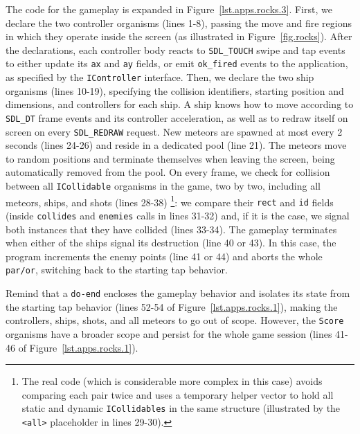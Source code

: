 \documentclass[preprint]{sigplanconf}
\newcommand{\code}[1] {{\small{\texttt{#1}}}}
\newcommand{\1}{\;}
\newcommand{\2}{\;\;}
\newcommand{\3}{\;\;\;}
\newcommand{\5}{\;\;\;\;\;}
\begin{document}
The code for the gameplay is expanded in Figure~\ref{lst.apps.rocks.3}.
%
First, we declare the two controller organisms (lines 1-8), passing the move 
and fire regions in which they operate inside the screen (as illustrated in 
Figure~\ref{fig.rocks}).
After the declarations, each controller body reacts to \code{SDL\_TOUCH} swipe 
and tap events to either update its \code{ax} and \code{ay} fields, or emit 
\code{ok\_fired} events to the application, as specified by the 
\code{IController} interface.
%
Then, we declare the two ship organisms (lines 10-19), specifying the collision 
identifiers, starting position and dimensions, and controllers for each ship.
A ship knows how to move according to \code{SDL\_DT} frame events and its 
controller acceleration, as well as to redraw itself on screen on every 
\code{SDL\_REDRAW} request.
%
New meteors are spawned at most every 2 seconds (lines 24-26) and reside in a 
dedicated pool (line 21).
The meteors move to random positions and terminate themselves when leaving the 
screen, being automatically removed from the pool.
%
On every frame, we check for collision between all \code{ICollidable} organisms 
in the game, two by two, including all meteors, ships, and shots (lines 
28-38)%
\footnote{
The real code (which is considerable more complex in this case) avoids 
comparing each pair twice and uses a temporary helper vector to hold all static 
and dynamic \code{ICollidables} in the same structure (illustrated by the 
\code{<all>} placeholder in lines 29-30).
}:
we compare their \code{rect} and \code{id} fields (inside \code{collides} and 
\code{enemies} calls in lines 31-32) and, if it is the case, we signal both
instances that they have collided (lines 33-34).
%
The gameplay terminates when either of the ships signal its destruction (line
40 or 43).
In this case, the program increments the enemy points (line 41 or 44) and 
aborts the whole \code{par/or}, switching back to the starting tap behavior.

Remind that a \code{do-end} encloses the gameplay behavior and isolates its 
state from the starting tap behavior (lines 52-54 of 
Figure~\ref{lst.apps.rocks.1}), making the controllers, ships, shots, and all 
meteors to go out of scope.
However, the \code{Score} organisms have a broader scope and persist for the 
whole game session (lines 41-46 of Figure~\ref{lst.apps.rocks.1}).
\end{document}
